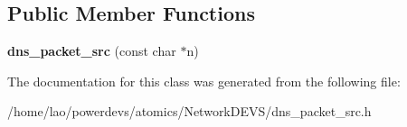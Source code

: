 \subsection*{Public Member Functions}
\begin{DoxyCompactItemize}
\item 
{\bfseries dns\+\_\+packet\+\_\+src} (const char $\ast$n)\hypertarget{classdns__packet__src_a6b057e9ffb6aa7fbbf52262e34a6d85c}{}\label{classdns__packet__src_a6b057e9ffb6aa7fbbf52262e34a6d85c}

\end{DoxyCompactItemize}


The documentation for this class was generated from the following file\+:\begin{DoxyCompactItemize}
\item 
/home/lao/powerdevs/atomics/\+Network\+D\+E\+V\+S/dns\+\_\+packet\+\_\+src.\+h\end{DoxyCompactItemize}
